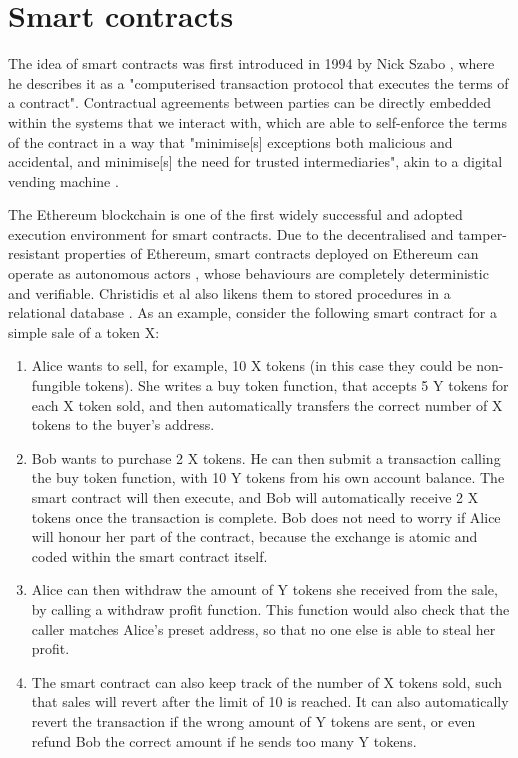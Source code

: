 \section{Smart contracts}

The idea of smart contracts was first introduced in 1994 by Nick Szabo \cite{nickszabosmartcontracts1},
where he describes it as a "computerised transaction protocol that executes the terms of a contract". 
Contractual agreements between parties can be directly embedded within the systems that we 
interact with, which are able to self-enforce the terms of the contract
in a way that "minimise[s] exceptions both malicious and accidental, and minimise[s] the need
for trusted intermediaries", akin to a digital vending machine \cite{nickszabosmartcontracts2}.

The Ethereum blockchain is one of the first widely successful and adopted execution environment for 
smart contracts. Due to the decentralised and tamper-resistant properties of Ethereum, 
smart contracts deployed on Ethereum can operate as autonomous actors \cite{smartcontractsforiot},
whose behaviours are completely deterministic and verifiable. Christidis et al also likens them to 
stored procedures in a relational database \cite{smartcontractsforiot}. As an example, consider the
following smart contract for a simple sale of a token X:

\begin{enumerate}
  \item Alice wants to sell, for example, 10 X tokens (in this case they could be non-fungible
  tokens). She writes a buy token function, that accepts 5 Y tokens for each X token sold,
  and then automatically transfers the correct number of X tokens to the buyer's address.
  \item Bob wants to purchase 2 X tokens. He can then submit a transaction calling the 
  buy token function, with 10 Y tokens from his own account balance. The smart contract will
  then execute, and Bob will automatically receive 2 X tokens once the transaction is complete.
  Bob does not need to worry if Alice will honour her part of the contract, because the
  exchange is atomic and coded within the smart contract itself.
  \item Alice can then withdraw the amount of Y tokens she received from the sale, by calling 
  a withdraw profit function. This function would also check that the caller matches Alice's
  preset address, so that no one else is able to steal her profit.
  \item The smart contract can also keep track of the number of X tokens sold, such that 
  sales will revert after the limit of 10 is reached. It can also automatically revert the 
  transaction if the wrong amount of Y tokens are sent, or even refund Bob the correct amount 
  if he sends too many Y tokens.
\end{enumerate}

